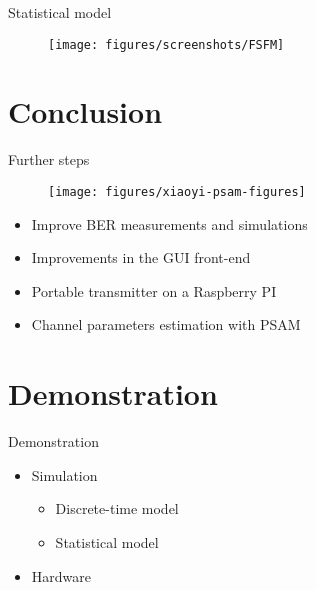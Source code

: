 \documentclass[xetex, onlymath, handout]{beamer}
\begin{document}
\begin{frame}{Statistical model}

	\begin{figure}
		\centering
		\texttt{[image: figures/screenshots/FSFM]}
	\end{figure}

\end{frame}

\section{Conclusion}

\begin{frame}{Further steps}

	\begin{figure}
		\centering
		\texttt{[image: figures/xiaoyi-psam-figures]}
	\end{figure}
	\begin{itemize}
		\item Improve BER measurements and simulations
		\item Improvements in the GUI front-end
		\item Portable transmitter on a Raspberry PI
		\item Channel parameters estimation with PSAM
	\end{itemize}

	
\end{frame}

\section{Demonstration}

\begin{frame}{Demonstration}
		\begin{itemize}
			\item Simulation
				\begin{itemize}
					\item Discrete-time model
					\item Statistical model
				\end{itemize}
			\item Hardware
		\end{itemize}
\end{frame}

\end{document}

